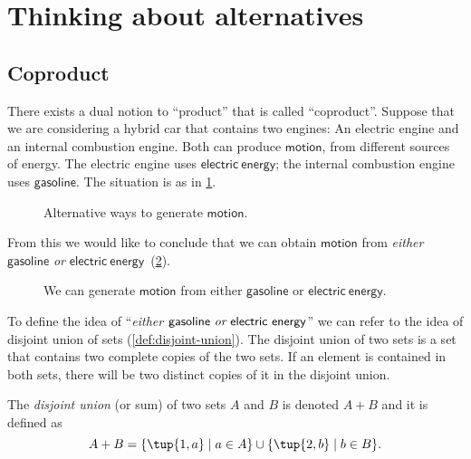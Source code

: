 \section{Thinking about alternatives}
\label{sec:coproductset}
\subsection{Coproduct}

There exists a dual notion to ``product'' that is called ``coproduct''. Suppose that we are considering a hybrid car that contains two engines: An
electric engine and an internal combustion engine. Both can produce $\mathsf{motion}$, from different sources of energy. The electric engine uses $\mathsf{electric}\ \mathsf{energy}$; the internal combustion engine uses $\mathsf{gasoline}$. The situation is as in \cref{fig:e16a}.

\begin{figure}[h!]
    \centering
    \caption{Alternative ways to generate $\mathsf{motion}$. \label{fig:e16a}}
\end{figure}

From this we would like to conclude that we can obtain $\mathsf{motion}$ from \emph{either} $\mathsf{gasoline}$ \emph{or}
$\mathsf{electric}\ \mathsf{energy}$~(\cref{fig:e16b}).

\begin{figure}[h!]
    \centering
    \caption{We can generate $\mathsf{motion}$ from either $\mathsf{gasoline}$ or $\mathsf{electric} \ \mathsf{energy}$. \label{fig:e16b}}
\end{figure}

To define the idea of ``\emph{either $\mathsf{gasoline}\ \emph{or} \ \mathsf{electric}\ \mathsf{energy}$}'' we can
refer to the idea of disjoint union of sets (\cref{def:disjoint-union}). The
disjoint union of two sets is a set that contains two complete copies of the two sets. If an element is contained in both sets, there will be two distinct copies of it in the disjoint union.

\begin{definition}
\label{def:disjoint-union}
    The \emph{disjoint union} (or sum) of two sets $A$ and $B$ is denoted $A + B$
    and it is defined as
    \begin{equation}
        A + B=\{\tup{1,a}\mid a\in A\}\cup\{\tup{2,b}\mid b\in B\}.
    \end{equation}
\end{definition}


